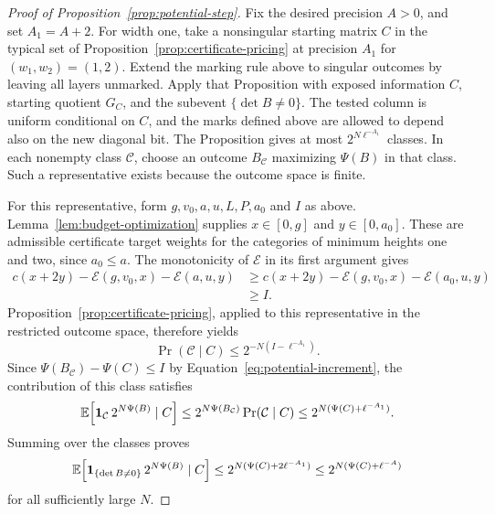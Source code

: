 \begin{proof}[Proof of Proposition~\ref{prop:potential-step}]
Fix the desired precision \(A>0\), and set \(A_1=A+2\). For width
one, take a nonsingular starting matrix \(C\) in the typical set of
Proposition~\ref{prop:certificate-pricing} at precision \(A_1\) for
\((w_1,w_2)=(1,2)\). Extend the marking rule above to singular
outcomes by leaving all layers unmarked. Apply that Proposition with
exposed information \(C\), starting quotient \(G_C\), and the subevent
\(\{\det B\ne0\}\).
The tested column is uniform conditional on \(C\), and the marks
defined above are allowed to depend also on the new diagonal bit.
The Proposition gives at most
\(2^{N\ell^{-A_1}}\) classes. In each nonempty class
\(\mathcal C\), choose an outcome \(B_{\mathcal C}\) maximizing
\(\Psi(B)\) in that class. Such a representative exists because
the outcome space is finite.

For this representative, form \(g,v_0,a,u,L,P,a_0\) and \(I\) as
above. Lemma~\ref{lem:budget-optimization} supplies \(x\in[0,g]\)
and \(y\in[0,a_0]\). These are admissible certificate target weights
for the categories of minimum heights one and two, since \(a_0\le a\).
The monotonicity of \(\mathcal E\) in its first argument gives
\[
 \begin{aligned}
 c(x+2y)-\mathcal E(g,v_0,x)-\mathcal E(a,u,y)
 &\ge c(x+2y)-\mathcal E(g,v_0,x)-\mathcal E(a_0,u,y)\\
 &\ge I.
 \end{aligned}
\]
Proposition~\ref{prop:certificate-pricing}, applied to this
representative in the restricted outcome space, therefore yields
\[
 \Pr(\mathcal C\mid C)\le2^{-N(I-\ell^{-A_1})}.
\]
Since \(\Psi(B_{\mathcal C})-\Psi(C)\le I\) by
Equation~\eqref{eq:potential-increment}, the contribution of this
class satisfies
\[
 \mathbb E\!\left[\mathbf 1_{\mathcal C}\,2^{N\Psi(B)}\mid C\right]
 \le 2^{N\Psi(B_{\mathcal C})}\Pr(\mathcal C\mid C)
 \le 2^{N(\Psi(C)+\ell^{-A_1})}.
\]
Summing over the classes proves
\[
 \mathbb E\!\left[\mathbf 1_{\{\det B\ne0\}}\,2^{N\Psi(B)}\mid C\right]
 \le2^{N(\Psi(C)+2\ell^{-A_1})}
 \le2^{N(\Psi(C)+\ell^{-A})}
\]
for all sufficiently large \(N\).


\end{proof}
